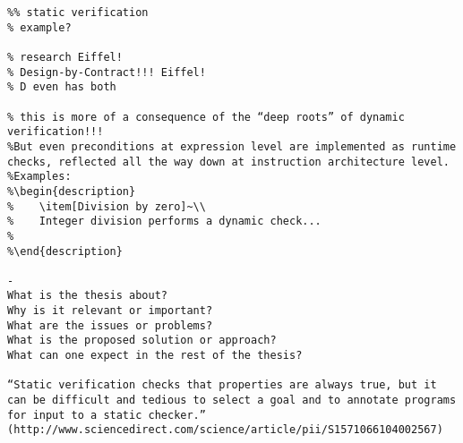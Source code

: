 \begin{verbatim}
%% static verification
% example?

% research Eiffel!
% Design-by-Contract!!! Eiffel!
% D even has both

% this is more of a consequence of the “deep roots” of dynamic verification!!!
%But even preconditions at expression level are implemented as runtime checks, reflected all the way down at instruction architecture level.
%Examples:
%\begin{description}
%    \item[Division by zero]~\\
%    Integer division performs a dynamic check...
%    
%\end{description}

- 
What is the thesis about?
Why is it relevant or important?
What are the issues or problems?
What is the proposed solution or approach?
What can one expect in the rest of the thesis?

“Static verification checks that properties are always true, but it can be difficult and tedious to select a goal and to annotate programs for input to a static checker.” (http://www.sciencedirect.com/science/article/pii/S1571066104002567)
\end{verbatim}